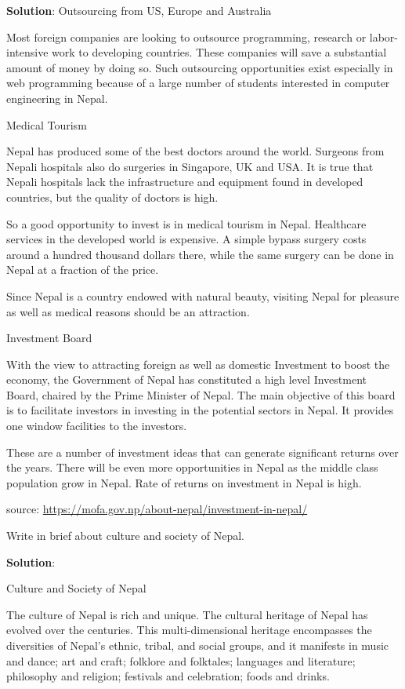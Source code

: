 \documentclass[
  openany]{book}
\newcommand{\question}{\item}
\newenvironment{solution}{ {\bfseries Solution}:}{}
\begin{document}
\begin{questions}
\begin{solution}
Outsourcing from US, Europe and Australia

Most foreign companies are looking to outsource programming, research or labor-intensive work to developing countries. These companies will save a substantial amount of money by doing so. Such outsourcing opportunities exist especially in web programming because of a large number of students interested in computer engineering in Nepal.

Medical Tourism

Nepal has produced some of the best doctors around the world. Surgeons from Nepali hospitals also do surgeries in Singapore, UK and USA. It is true that Nepali hospitals lack the infrastructure and equipment found in developed countries, but the quality of doctors is high.

So a good opportunity to invest is in medical tourism in Nepal. Healthcare services in the developed world is expensive. A simple bypass surgery costs around a hundred thousand dollars there, while the same surgery can be done in Nepal at a fraction of the price.

Since Nepal is a country endowed with natural beauty, visiting Nepal for pleasure as well as medical reasons should be an attraction.

Investment Board

With the view to attracting foreign as well as domestic Investment to boost the economy, the Government of Nepal has constituted a high level Investment Board, chaired by the Prime Minister of Nepal. The main objective of this board is to facilitate investors in investing in the potential sectors in Nepal. It provides one window facilities to the investors.

These are a number of investment ideas that can generate significant returns over the years. There will be even more opportunities in Nepal as the middle class population grow in Nepal. Rate of returns on investment in Nepal is high.

source: \url{https://mofa.gov.np/about-nepal/investment-in-nepal/}
\end{solution}

\question Write in brief about culture and society of Nepal.

\begin{solution}

Culture and Society of Nepal

The culture of Nepal is rich and unique. The cultural heritage of Nepal has evolved over the centuries. This multi-dimensional heritage encompasses the diversities of Nepal’s ethnic, tribal, and social groups, and it manifests in music and dance; art and craft; folklore and folktales; languages and literature; philosophy and religion; festivals and celebration; foods and drinks.


\end{solution}
\end{questions}
\end{document}

